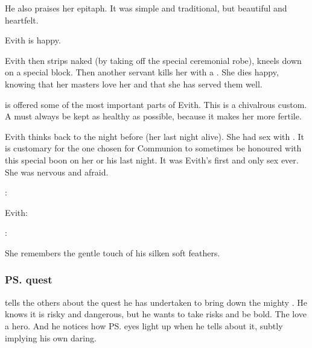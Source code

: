 \begin{garbage}
He also praises her epitaph. 
It was simple and traditional, but beautiful and heartfelt. 

Evith is happy. 

Evith then strips naked (by taking off the special ceremonial robe), kneels down on a special block. 
Then another servant kills her with a . 
She dies happy, knowing that her masters love her and that she has served them well. 

\Firaxel{} is offered some of the most important parts of Evith. 
This is a chivalrous custom. 
A \resvil{} must always be kept as healthy as possible, because it makes her more fertile. 

Evith thinks back to the night before (her last night alive). 
She had sex with \Teshrial. 
It is customary for the one chosen for Communion to sometimes be honoured with this special boon on her or his last night. 
It was Evith's first and only sex ever. 
She was nervous and afraid. 

\begin{prose}
  \Teshrial: 
  
  Evith: 
  
  \Teshrial: 
\end{prose}

She remembers the gentle touch of his silken soft feathers. 





\subsubsection{\ps{\Teshrial} quest}
\Teshrial{} tells the others about the quest he has undertaken to bring down the mighty \Ishnaruchaefir. 
He knows it is risky and dangerous, but he wants to take risks and be bold. 
The \resviel{} love a hero. 
And he notices how \ps{\Firaxel} eyes light up when he tells about it, subtly implying his own daring. 


\end{garbage}
